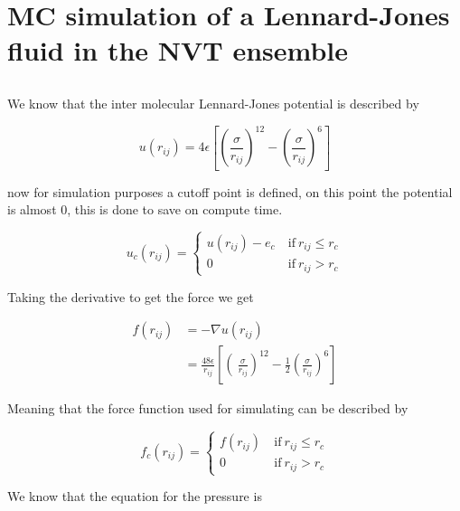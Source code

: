 \section{ MC simulation of a Lennard-Jones fluid in the NVT ensemble}

\subsection{}
We know that the inter molecular Lennard-Jones potential is described by

\begin{equation}
	u(r_{ij}) =4\epsilon\left[ \left(\frac{\sigma}{r_{ij}}\right)^{12}-\left(\frac{\sigma}{r_{ij}}\right)^6\right] 
\end{equation}

now for simulation purposes a cutoff point is defined, on this point the potential is almost 0, this is done to save on compute time.

\begin{equation}
		u_c(r_{ij}) = 
		\begin{cases}
			u(r_{ij})-e_c\ & \text{if}\ r_{ij} \le r_c\\
			0\ & \text{if}\  r_{ij} > r_c
		\end{cases}
\end{equation}

Taking the derivative to get the force we get

\begin{equation}
	\begin{split}
		f(r_{ij}) & = - \nabla u(r_{ij})\\
		& =  \frac{48 \epsilon}{r_{ij}} \left[ \left(\ \frac{\sigma}{r_{ij}}\right)^{12}-\frac{1}{2}\left(\frac{\sigma}{r_{ij}}\right)^6\right] 
	\end{split}
	\label{eq: LJ force}
\end{equation}

Meaning that the force function used for simulating can be described by

\begin{equation}
	f_c(r_{ij}) = 
	\begin{cases}
		f(r_{ij})\ & \text{if}\ r_{ij} \le r_c\\
		0\ & \text{if}\  r_{ij} > r_c
	\end{cases}
\end{equation}



We know that the equation for the pressure is

